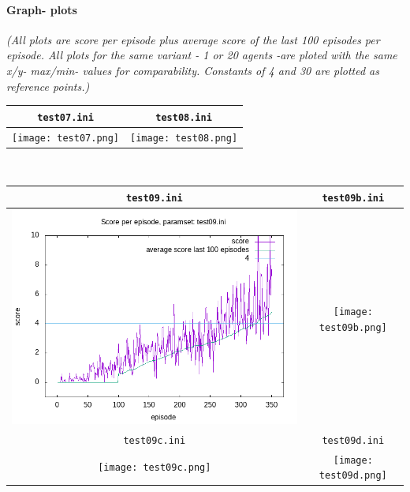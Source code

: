 \documentclass[a4paper]{article}
\begin{document}
\paragraph{Graph- plots}

\textit{(All plots are score per episode plus average score of the last 100 episodes per episode.
All plots for the same variant - 1 or 20 agents -are ploted with the same x/y- max/min- values
for comparability. Constants of 4 and 30 are plotted as reference points.)}
\\
\begin{tabular}{ |c|c| }
  \hline
  \texttt{test07.ini} & \texttt{test08.ini} \\
  \hline
  \texttt{[image: test07.png]} & \texttt{[image: test08.png]} \\
  \hline
\end{tabular}
\\
\begin{tabular}{ |c|c| }
  \hline
  \texttt{test09.ini} & \texttt{test09b.ini} \\
  \hline
  \includegraphics[scale=0.35]{test09.png} & \texttt{[image: test09b.png]} \\
  \hline
  \texttt{test09c.ini} & \texttt{test09d.ini} \\
  \hline
  \texttt{[image: test09c.png]} & \texttt{[image: test09d.png]} \\
  \hline
\end{tabular}
\\
\end{document}
